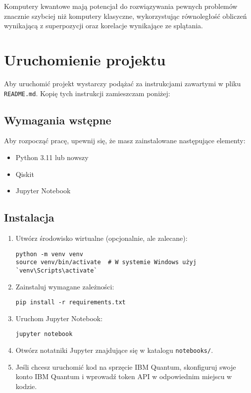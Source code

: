 \documentclass[a4paper,12pt]{article}
\begin{document}
Komputery kwantowe mają potencjał do rozwiązywania pewnych problemów znacznie 
szybciej niż komputery klasyczne, wykorzystując równoległość obliczeń 
wynikającą z superpozycji oraz korelacje wynikające ze splątania.

\section{Uruchomienie projektu}

Aby uruchomić projekt wystarczy podążać za instrukcjami zawartymi w pliku 
\texttt{README.md}. Kopię tych instrukcji zamieszczam poniżej:


\subsection{Wymagania wstępne}

Aby rozpocząć pracę, upewnij się, że masz zainstalowane następujące elementy:

\begin{itemize}
    \item Python 3.11 lub nowszy
    \item Qiskit
    \item Jupyter Notebook
\end{itemize}

\subsection{Instalacja}

\begin{enumerate}
    \item Utwórz środowisko wirtualne (opcjonalnie, ale zalecane):
    \begin{verbatim}
python -m venv venv
source venv/bin/activate  # W systemie Windows użyj `venv\Scripts\activate`
    \end{verbatim}

    \item Zainstaluj wymagane zależności:
    \begin{verbatim}
pip install -r requirements.txt
    \end{verbatim}

    \item Uruchom Jupyter Notebook:
    \begin{verbatim}
jupyter notebook
    \end{verbatim}

    \item Otwórz notatniki Jupyter znajdujące się w katalogu \texttt{notebooks/}.

    \item Jeśli chcesz uruchomić kod na sprzęcie IBM Quantum, skonfiguruj swoje
     konto IBM Quantum i wprowadź token API w odpowiednim miejscu w kodzie.
\end{enumerate}
\end{document}
